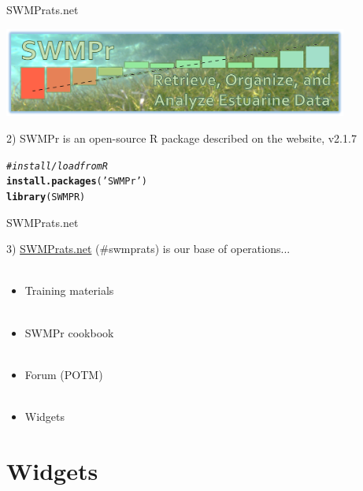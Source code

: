 \documentclass[xcolor=dvipsnames,serif]{beamer}\usepackage[]{graphicx}\usepackage[]{color}
\makeatletter
\newcommand{\hlstr}[1]{\textcolor[rgb]{0.192,0.494,0.8}{#1}}%
\newcommand{\hlcom}[1]{\textcolor[rgb]{0.678,0.584,0.686}{\textit{#1}}}%
\newcommand{\hlstd}[1]{\textcolor[rgb]{0.345,0.345,0.345}{#1}}%
\newcommand{\hlkwd}[1]{\textcolor[rgb]{0.737,0.353,0.396}{\textbf{#1}}}%
\newenvironment{kframe}{%
 \def\at@end@of@kframe{}%
 \ifinner\ifhmode%
  \def\at@end@of@kframe{\end{minipage}}%
  \begin{minipage}{\columnwidth}%
 \fi\fi%
 \def\FrameCommand##1{\hskip\@totalleftmargin \hskip-\fboxsep
 \colorbox{shadecolor}{##1}\hskip-\fboxsep
     \hskip-\linewidth \hskip-\@totalleftmargin \hskip\columnwidth}%
 \MakeFramed {\advance\hsize-\width
   \@totalleftmargin\z@ \linewidth\hsize
   \@setminipage}}%
 {\par\unskip\endMakeFramed%
 \at@end@of@kframe}
\newenvironment{knitrout}{}{} %
\makeatother
\begin{document}
\begin{frame}[fragile]{SWMPrats.net}
\centerline{\includegraphics[width = 0.85\textwidth]{imgs/swmpr_logo.png}}
\vspace{0.2in}
2) SWMPr is an open-source R package described on the website, v2.1.7
\begin{knitrout}\scriptsize
{}\color{fgcolor}\begin{kframe}
\begin{alltt}
\hlcom{# install/load from R}
\hlkwd{install.packages}\hlstd{(}\hlstr{'SWMPr'}\hlstd{)}
\hlkwd{library}\hlstd{(SWMPR)}
\end{alltt}
\end{kframe}
\end{knitrout}
\end{frame}

\begin{frame}{SWMPrats.net}
\centerline{}
\vspace{0.15in}
3) \href{http://swmprats.net}{SWMPrats.net} (\#swmprats) is our base of operations... \\~\\
\begin{itemize}
\item Training materials \\~\\
\item SWMPr cookbook \\~\\
\item Forum (POTM)\\~\\
\item Widgets
\end{itemize}
\end{frame}

\section{Widgets}
\end{document}
